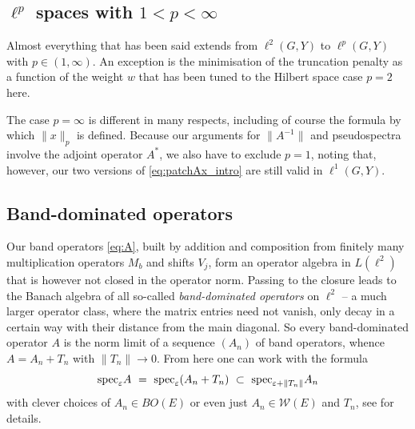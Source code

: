 \documentclass{article}
\newcommand\Simon[1]{\marginpar{\textcolor{red}{\tt #1}}}
\newcommand\Marko[1]{\marginpar{\textcolor{blue}{\tt #1}}}
\newcommand\N{{\mathbb N}}
\newcommand\I{{\mathbb I}}
\newcommand\W{{\mathcal W}}
\newcommand\Z{{\mathbb Z}}
\newcommand\eps{{\varepsilon}}
\newcommand\specn{{\rm spec}}   %
\newcommand\speps{{\rm spec}_\eps}
\numberwithin{equation}{section}   %
\numberwithin{figure}{section}  %
\begin{document}
\subsection{\texorpdfstring{$\ell^p$}{lp} spaces with \texorpdfstring{$1<p<\infty$}{1<p<infty}}
Almost everything that has been said extends from $\ell^2(G,Y)$ to $\ell^p(G,Y)$ with $p\in (1,\infty)$. An exception is the minimisation of the truncation penalty as a function of the weight $w$ that has been tuned to the Hilbert space case $p=2$ here. 

The case $p=\infty$ is different in many respects, including of course the formula by which $\|x\|_p$ is defined. Because our arguments for $\|A^{-1}\|$ and pseudospectra involve the adjoint operator $A^*$, we also have to exclude $p=1$, noting that, however, our two versions of \eqref{eq:patchAx_intro} are still valid in $\ell^1(G,Y)$.

\subsection{Band-dominated operators} 
Our band operators \eqref{eq:A}, built by addition and composition from finitely many multiplication operators $M_b$ and shifts $V_j$, form an operator algebra in $L(\ell^2)$ that is however not closed in the operator norm. Passing to the closure leads to the Banach algebra of all so-called {\sl band-dominated operators} on $\ell^2$ -- a much larger operator class, where the matrix entries need not vanish, only decay in a certain way with their distance from the main diagonal. So every band-dominated operator $A$ is the norm limit of a sequence $(A_n)$ of band operators, whence $A=A_n+T_n$ with $\|T_n\|\to 0$. From here one can work with the formula 
\begin{equation} \label{eq:perturb}
\speps A\ =\ \speps(A_n+T_n)\ \subset\ \specn_{\eps+\|T_n\|}A_n
\end{equation}
with clever choices of $A_n\in BO(E)$ or even just $A_n\in\W(E)$ and $T_n$, see \cite{CW.Heng.ML:JST} for details.

%
\end{document}

